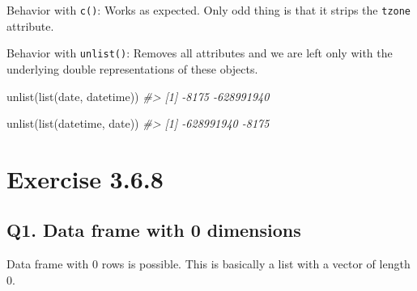 \documentclass[
]{book}
\newenvironment{Shaded}{\begin{snugshade}}{\end{snugshade}}
\newcommand{\CommentTok}[1]{\textcolor[rgb]{0.56,0.35,0.01}{\textit{#1}}}
\newcommand{\FunctionTok}[1]{\textcolor[rgb]{0.00,0.00,0.00}{#1}}
\newcommand{\NormalTok}[1]{#1}
\begin{document}
Behavior with \texttt{c()}: Works as expected. Only odd thing is that it strips the \texttt{tzone} attribute.

\begin{Shaded}
\end{Shaded}

Behavior with \texttt{unlist()}: Removes all attributes and we are left only with the underlying double representations of these objects.

\begin{Shaded}
\begin{Highlighting}[]
\FunctionTok{unlist}\NormalTok{(}\FunctionTok{list}\NormalTok{(date, datetime))}
\CommentTok{\#\textgreater{} [1]      {-}8175 {-}628991940}

\FunctionTok{unlist}\NormalTok{(}\FunctionTok{list}\NormalTok{(datetime, date))}
\CommentTok{\#\textgreater{} [1] {-}628991940      {-}8175}
\end{Highlighting}
\end{Shaded}

\hypertarget{exercise-3.6.8}{%
\section{Exercise 3.6.8}\label{exercise-3.6.8}}

\hypertarget{q1.-data-frame-with-0-dimensions}{%
\subsection*{Q1. Data frame with 0 dimensions}\label{q1.-data-frame-with-0-dimensions}}

Data frame with 0 rows is possible. This is basically a list with a vector of length 0.
\end{document}

